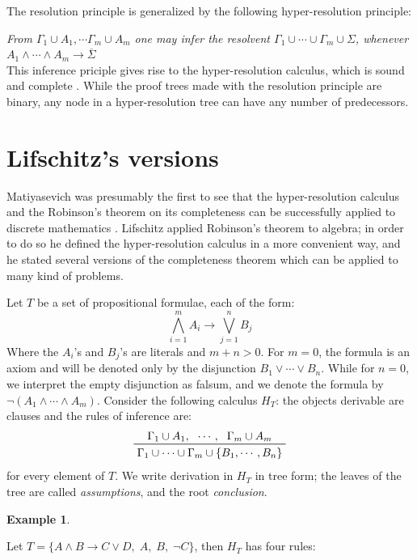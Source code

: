 \documentclass[a4paper,12pt,oneside]{book}
\newtheorem{example}[theorem]{Example}
\let\o\vee
\let\e\wedge
\begin{document}
\newpage\noindent
The resolution principle is generalized by the following hyper-resolution principle:

\textit{From $\Gamma_1\cup A_1,\cdots\Gamma_m\cup A_m $ one may infer the resolvent $\Gamma_1\cup\cdots\cup\Gamma_m\cup \Sigma$, whenever $A_1\e\cdots\e A_m\rightarrow \overline{\Sigma}$}\\  
This inference priciple gives rise to the hyper-resolution calculus, which is sound and complete \cite{rob,robinson-general}. While the proof trees made with the resolution principle are binary, any node in a hyper-resolution tree can have any number of predecessors.


\section{Lifschitz's versions}
Matiyasevich was presumably the first to see that the hyper-resolution calculus and the Robinson's theorem on its completeness can be successfully applied to discrete mathematics \cite{mat-1,mat-2}. Lifschitz applied Robinson's theorem to algebra\cite{lifschitz}; in order to do so  he defined the hyper-resolution calculus in a more convenient way, and he stated several versions of the completeness theorem which can be applied to many kind of problems.

Let $T$ be a set of propositional formulae, each of the form:
\begin{equation}\label{prototipo}
\bigwedge_{i=1}^m A_i \rightarrow \bigvee_{j=1}^n B_j 
\end{equation}
Where the $A_i$'s and $B_j$'s are literals and $m+n>0$. For $m=0$, the formula is an axiom and will be denoted only by the disjunction $B_1\o\cdots\o B_n$. While for $n=0$, we interpret the empty disjunction as falsum, and we denote the formula by $\neg (A_1\e\cdots\e A_m)$.
Consider the following calculus $H_T$: the objects derivable are clauses and the rules of inference are:
\begin{equation}\label{axiom}
\prftree{\Gamma_1 \cup A_1 ,} {\cdots,} {\Gamma_m \cup A_m } 
{\Gamma_1\cup\cdots\cup\Gamma_m\cup\{ B_1 ,\cdots ,B_n\}}
\end{equation}
for every element of $T$. We write derivation in $H_T$ in tree form; the leaves of the tree are called \textit{assumptions}, and the root \textit{conclusion}.


\noindent\begin{example}
\end{example} Let $T=\{ A \e B \rightarrow C \o D ,\; A,\; B,\; \neg C \}$, then $H_T$ has four rules:
\end{document}
